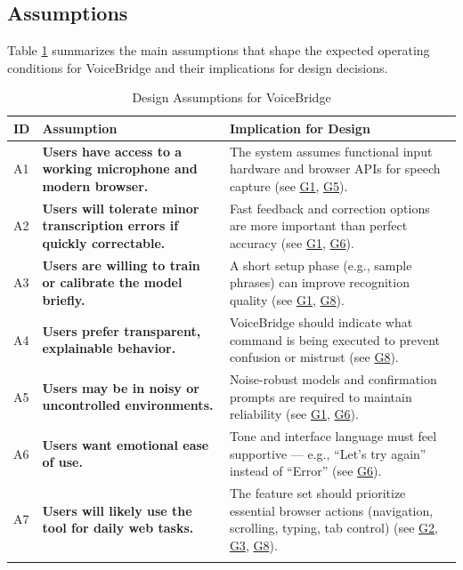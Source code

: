 \documentclass[11pt]{article}
\begin{document}
\subsection{Assumptions}
Table \ref{tab:assumptions} summarizes the main assumptions that shape the expected operating conditions for VoiceBridge and their implications for design decisions.

\begin{table}[H]
\centering
\begin{tabularx}{\textwidth}{p{1cm}p{6cm}X}
\toprule {\textbf{ID}} & {\textbf{Assumption}} & {\textbf{Implication for Design}}\\
\midrule
A1 & \textbf{Users have access to a working microphone and modern browser.} & The system assumes functional input hardware and browser APIs for speech capture (see \hyperref[tab:project-goals]{G1}, \hyperref[tab:project-goals]{G5}). \\ \hline
A2 & \textbf{Users will tolerate minor transcription errors if quickly correctable.} & Fast feedback and correction options are more important than perfect accuracy (see \hyperref[tab:project-goals]{G1}, \hyperref[tab:project-goals]{G6}). \\ \hline
A3 & \textbf{Users are willing to train or calibrate the model briefly.} & A short setup phase (e.g., sample phrases) can improve recognition quality (see \hyperref[tab:project-goals]{G1}, \hyperref[tab:project-goals]{G8}). \\ \hline
A4 & \textbf{Users prefer transparent, explainable behavior.} & VoiceBridge should indicate what command is being executed to prevent confusion or mistrust (see \hyperref[tab:project-goals]{G8}). \\ \hline
A5 & \textbf{Users may be in noisy or uncontrolled environments.} & Noise-robust models and confirmation prompts are required to maintain reliability (see \hyperref[tab:project-goals]{G1}, \hyperref[tab:project-goals]{G6}). \\ \hline
A6 & \textbf{Users want emotional ease of use.} & Tone and interface language must feel supportive — e.g., “Let’s try again” instead of “Error” (see \hyperref[tab:project-goals]{G6}). \\ \hline
A7 & \textbf{Users will likely use the tool for daily web tasks.} & The feature set should prioritize essential browser actions (navigation, scrolling, typing, tab control) (see \hyperref[tab:project-goals]{G2}, \hyperref[tab:project-goals]{G3}, \hyperref[tab:project-goals]{G8}). \\
\bottomrule
\caption{Design Assumptions for VoiceBridge}
\label{tab:assumptions}
\end{tabularx}
\end{table}
\end{document}
